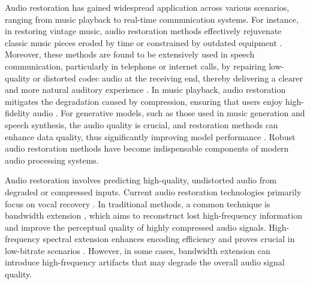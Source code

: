 Audio restoration has gained widespread application across various scenarios, ranging from music playback to real-time communication systems. For instance, in restoring vintage music, audio restoration methods effectively rejuvenate classic music pieces eroded by time or constrained by outdated equipment \cite{lattner2021stochastic,liu2021voicefixer}. Moreover, these methods are found to be extensively used in speech communication, particularly in telephone or internet calls, by repairing low-quality or distorted codec audio at the receiving end, thereby delivering a clearer and more natural auditory experience \cite{deng2020exploiting,dietz2002spectral,backstrom2017speech,li2024audio}. In music playback, audio restoration mitigates the degradation caused by compression, ensuring that users enjoy high-fidelity audio \cite{deng2020exploiting,lemercier2024diffusion,moliner2023solving}. For generative models, such as those used in music generation and speech synthesis, the audio quality is crucial, and restoration methods can enhance data quality, thus significantly improving model performance \cite{ji2020comprehensive,uhlich2024sound}. Robust audio restoration methods have become indispensable components of modern audio processing systems.

Audio restoration involves predicting high-quality, undistorted audio from degraded or compressed inputs. Current audio restoration technologies primarily focus on vocal recovery \cite{deng2020exploiting,dietz2002spectral,backstrom2017speech}. In traditional methods, a common technique is bandwidth extension \cite{dietz2002spectral,backstrom2017speech}, which aims to reconstruct lost high-frequency information and improve the perceptual quality of highly compressed audio signals. High-frequency spectral extension enhances encoding efficiency and proves crucial in low-bitrate scenarios \cite{larsen2005audio}. However, in some cases, bandwidth extension can introduce high-frequency artifacts that may degrade the overall audio signal quality.

